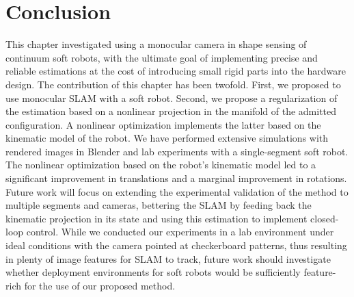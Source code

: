 \section{Conclusion}
\label{sec:srslam:conclusions}

This chapter investigated using a monocular camera in shape sensing of continuum soft robots, with the ultimate goal of implementing precise and reliable estimations at the cost of introducing small rigid parts into the hardware design. The contribution of this chapter has been twofold. First, we proposed to use monocular \gls{SLAM} with a soft robot. Second, we propose a regularization of the estimation based on a nonlinear projection in the manifold of the admitted configuration. A nonlinear optimization implements the latter based on the kinematic model of the robot. We have performed extensive simulations with rendered images in Blender and lab experiments with a single-segment soft robot. The nonlinear optimization based on the robot's kinematic model led to a significant improvement in translations and a marginal improvement in rotations. 
Future work will focus on extending the experimental validation of the method to multiple segments and cameras, bettering the SLAM by feeding back the kinematic projection in its state and using this estimation to implement closed-loop control.
While we conducted our experiments in a lab environment under ideal conditions with the camera pointed at checkerboard patterns, thus resulting in plenty of image features for \gls{SLAM} to track, future work should investigate whether deployment environments for soft robots would be sufficiently feature-rich for the use of our proposed method.
